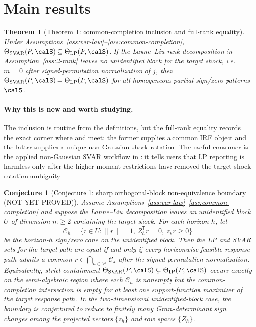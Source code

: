 \documentclass[11pt]{article}
\newcommand{\transpose}{\mathsf{T}}
\newcommand{\calH}{\mathcal{H}}
\theoremstyle{definition}
\theoremstyle{plain}
\newtheorem{theorem}{Theorem}
\newtheorem{conjecture}{Conjecture}
\theoremstyle{remark}
\begin{document}
\section{Main results}
\begin{theorem}[Theorem 1: common-completion inclusion and full-rank equality]\label{thm:inclusion}
Under Assumptions~\ref{ass:var-law}--\ref{ass:common-completion}, $\Theta_{\mathrm{SVAR}}(P,\calS)\subseteq\Theta_{\mathrm{LP}}(P,\calS)$.  If the Lanne--Liu rank decomposition in Assumption~\ref{ass:ll-rank} leaves no unidentified block for the target shock, i.e. $m=0$ after signed-permutation normalization of $j$, then $\Theta_{\mathrm{SVAR}}(P,\calS)=\Theta_{\mathrm{LP}}(P,\calS)$ for all homogeneous partial sign/zero patterns $\calS$.
\end{theorem}

\paragraph{Why this is new and worth studying.}
The inclusion is routine from the definitions, but the full-rank equality records the exact corner where \citet{PlagborgMollerWolf2021} and \citet{LanneMeitzSaikkonen2017} meet: the former supplies a common IRF object and the latter supplies a unique non-Gaussian shock rotation.  The useful consumer is the applied non-Gaussian SVAR workflow in \citet{LanneMeitzSaikkonen2017}: it tells users that LP reporting is harmless only after the higher-moment restrictions have removed the target-shock rotation ambiguity.

\begin{conjecture}[Conjecture 1: sharp orthogonal-block non-equivalence boundary (NOT YET PROVED)]\label{conj:orth-block-boundary}
Assume Assumptions~\ref{ass:var-law}--\ref{ass:common-completion} and suppose the Lanne--Liu decomposition leaves an unidentified block $U$ of dimension $m\ge 2$ containing the target shock.  For each horizon $h$, let
\[
  \mathcal{C}_h=\{r\in U:\|r\|=1,\ Z_h^{\transpose}r=0,\ z_h^{\transpose}r\ge 0\}
\]
be the horizon-$h$ sign/zero cone on the unidentified block.  Then the LP and SVAR sets for the target path are equal if and only if every horizonwise feasible response path admits a common $r\in\bigcap_{h\in\calH}\mathcal{C}_h$ after the signed-permutation normalization.  Equivalently, strict containment $\Theta_{\mathrm{SVAR}}(P,\calS)\subsetneq\Theta_{\mathrm{LP}}(P,\calS)$ occurs exactly on the semi-algebraic region where each $\mathcal{C}_h$ is nonempty but the common-completion intersection is empty for at least one support-function maximizer of the target response path.  In the two-dimensional unidentified-block case, the boundary is conjectured to reduce to finitely many Gram-determinant sign changes among the projected vectors $\{z_h\}$ and row spaces $\{Z_h\}$.
\end{conjecture}
\end{document}
